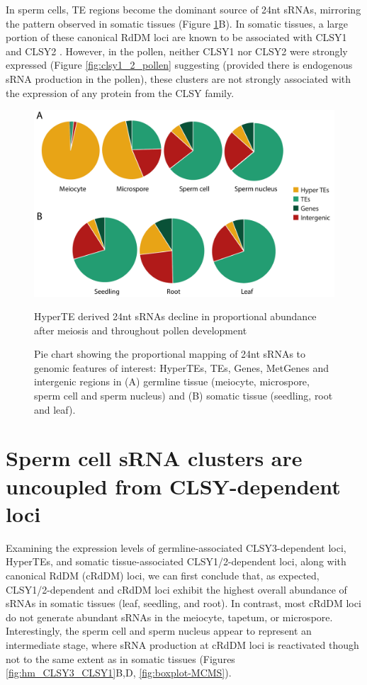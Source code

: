 In sperm cells, TE regions become the dominant source of 24nt sRNAs, mirroring the pattern observed in somatic tissues (Figure \ref{fig:sRNA_pie}B). In somatic tissues, a large portion of these canonical RdDM loci are known to be associated with CLSY1 and CLSY2 \cite{RN23}. However, in the pollen, neither CLSY1 nor CLSY2 were strongly expressed (Figure \ref{fig:clsy1_2_pollen} suggesting (provided there is endogenous sRNA production in the pollen), these clusters are not strongly associated with the expression of any protein from the CLSY family.

\begin{figure}[htbp!] 
\centering    
    \includegraphics[width=1\textwidth]{Chapter2/Figs/Figure7_Pie_charts.pdf}
\caption{HyperTE derived 24nt sRNAs decline in proportional abundance after meiosis and throughout pollen development}
\label{fig:sRNA_pie}
\captionsetup{font=small}
    \caption*{Pie chart showing the proportional mapping of 24nt sRNAs to genomic features of interest: HyperTEs, TEs, Genes, MetGenes and intergenic regions in (A) germline tissue (meiocyte, microspore, sperm cell and sperm nucleus) and (B) somatic tissue (seedling, root and leaf).}
\end{figure}

\section{Sperm cell sRNA clusters are uncoupled from CLSY-dependent loci}

Examining the expression levels of germline-associated CLSY3-dependent loci, HyperTEs, and somatic tissue-associated CLSY1/2-dependent loci, along with canonical RdDM (cRdDM) loci, we can first conclude that, as expected, CLSY1/2-dependent and cRdDM loci exhibit the highest overall abundance of sRNAs in somatic tissues (leaf, seedling, and root). In contrast, most cRdDM loci do not generate abundant sRNAs in the meiocyte, tapetum, or microspore. Interestingly, the sperm cell and sperm nucleus appear to represent an intermediate stage, where sRNA production at cRdDM loci is reactivated though not to the same extent as in somatic tissues (Figures \ref{fig:hm_CLSY3_CLSY1}B,D, \ref{fig:boxplot-MCMS}).

